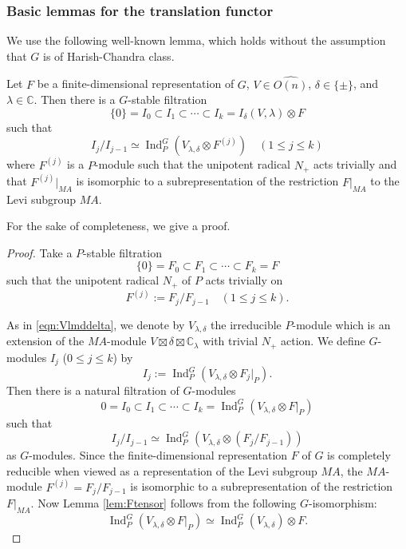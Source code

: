 \subsubsection{Basic lemmas for the translation functor}
\label{subsec:tensorcomb}
We use the following well-known lemma, 
 which holds 
 without the assumption that $G$ is of Harish-Chandra class.  
\begin{lemma}
\label{lem:Ftensor}
Let $F$ be a finite-dimensional representation
 of $G$, 
 $V \in \widehat{O(n)}$, 
 $\delta \in \{\pm\}$, 
 and $\lambda \in {\mathbb{C}}$.  
Then there is a $G$-stable filtration
\[
  \{0\} = I_0 \subset I_1 \subset \cdots \subset I_k 
 = I_{\delta}(V, \lambda) \otimes F
\]
such that
\[
 I_j /I_{j-1} \simeq \operatorname{Ind}_P^G(V_{\lambda,\delta} \otimes F^{(j)})
\quad
  (1 \le j \le k)
\]
where $F^{(j)}$ is a $P$-module
 such that the unipotent radical $N_+$ acts trivially
 and that $F^{(j)}|_{M A}$ is isomorphic to a subrepresentation
 of the restriction $F|_{M A}$ to the Levi subgroup $M A$.  
\end{lemma}
For the sake of completeness, 
we give a proof.  
\begin{proof}
Take a $P$-stable filtration
\[
   \{0\} = F_0 \subset F_1 \subset \cdots \subset F_k = F
\]
 such that the unipotent radical $N_+$ of $P$ acts trivially
 on 
\[
  F^{(j)}:=F_j/F_{j-1}
\quad (1 \le j \le k).  
\]


As in \eqref{eqn:Vlmddelta}, 
 we denote by 
$V_{\lambda,\delta}$
 the irreducible $P$-module
 which is an extension of the $M A$-module
 $V \boxtimes \delta \boxtimes {\mathbb{C}}_{\lambda}$
 with trivial $N_+$ action.  
We define $G$-modules $I_j$ ($0 \le j \le k$)
 by 
\[
  I_j:=\operatorname{Ind}_P^G(V_{\lambda,\delta} \otimes F_j|_P).  
\]
Then there is a natural filtration of $G$-modules
\[
 0 =
 I_0
\subset
I_1
\subset
\cdots
\subset
I_k=\operatorname{Ind}_P^G(V_{\lambda,\delta} \otimes F|_P)
\]
such that 
\[
I_j/I_{j-1}
\simeq
\operatorname{Ind}_P^G(V_{\lambda,\delta} \otimes (F_j/F_{j-1}))
\]
as $G$-modules.  
Since the finite-dimensional representation $F$ of $G$
 is completely reducible
 when viewed as a representation of the Levi subgroup $M A$, 
 the $M A$-module 
$
   F^{(j)}=F_j/F_{j-1}
$
 is isomorphic
 to a subrepresentation of the restriction $F|_{M A}$.  
Now Lemma \ref{lem:Ftensor} follows from the following $G$-isomorphism:
\[
 \operatorname{Ind}_P^G(V_{\lambda,\delta} \otimes F|_P)
 \simeq
 \operatorname{Ind}_P^G(V_{\lambda,\delta}) \otimes F.  
\]
\end{proof}
